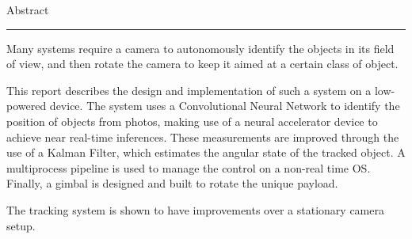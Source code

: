 {\Large Abstract}\\
\hrule


Many systems require a camera to autonomously identify the objects in its field of view, and then rotate the camera to keep it aimed at a certain class of object.

This report describes the design and implementation of such a system on a low-powered device. The system uses a Convolutional Neural Network to identify the position of objects from photos, making use of a neural accelerator device to achieve near real-time inferences. These measurements are improved through the use of a Kalman Filter, which estimates the angular state of the tracked object. A multiprocess pipeline is used to manage the control on a non-real time OS. Finally, a gimbal is designed and built to rotate the unique payload.

The tracking system is shown to have improvements over a stationary camera setup.

\newpage
